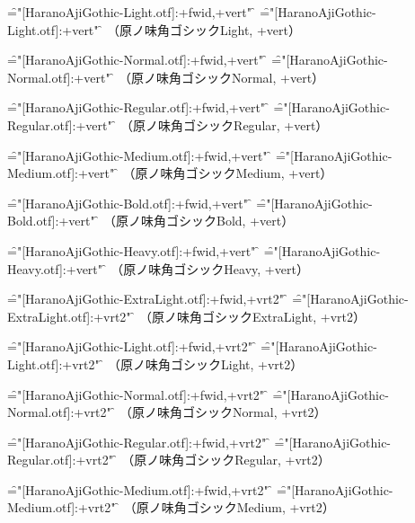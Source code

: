 \font\f="[HaranoAjiGothic-Light.otf]:+fwid,+vert" \f
\testfwid
\font\f="[HaranoAjiGothic-Light.otf]:+vert" \f
\test
（原ノ味角ゴシックLight, +vert）\par

\font\f="[HaranoAjiGothic-Normal.otf]:+fwid,+vert" \f
\testfwid
\font\f="[HaranoAjiGothic-Normal.otf]:+vert" \f
\test
（原ノ味角ゴシックNormal, +vert）\par

\font\f="[HaranoAjiGothic-Regular.otf]:+fwid,+vert" \f
\testfwid
\font\f="[HaranoAjiGothic-Regular.otf]:+vert" \f
\test
（原ノ味角ゴシックRegular, +vert）\par

\font\f="[HaranoAjiGothic-Medium.otf]:+fwid,+vert" \f
\testfwid
\font\f="[HaranoAjiGothic-Medium.otf]:+vert" \f
\test
（原ノ味角ゴシックMedium, +vert）\par

\font\f="[HaranoAjiGothic-Bold.otf]:+fwid,+vert" \f
\testfwid
\font\f="[HaranoAjiGothic-Bold.otf]:+vert" \f
\test
（原ノ味角ゴシックBold, +vert）\par

\font\f="[HaranoAjiGothic-Heavy.otf]:+fwid,+vert" \f
\testfwid
\font\f="[HaranoAjiGothic-Heavy.otf]:+vert" \f
\test
（原ノ味角ゴシックHeavy, +vert）\par


\font\f="[HaranoAjiGothic-ExtraLight.otf]:+fwid,+vrt2" \f
\testfwid
\font\f="[HaranoAjiGothic-ExtraLight.otf]:+vrt2" \f
\test
（原ノ味角ゴシックExtraLight, +vrt2）\par

\font\f="[HaranoAjiGothic-Light.otf]:+fwid,+vrt2" \f
\testfwid
\font\f="[HaranoAjiGothic-Light.otf]:+vrt2" \f
\test
（原ノ味角ゴシックLight, +vrt2）\par

\font\f="[HaranoAjiGothic-Normal.otf]:+fwid,+vrt2" \f
\testfwid
\font\f="[HaranoAjiGothic-Normal.otf]:+vrt2" \f
\test
（原ノ味角ゴシックNormal, +vrt2）\par

\font\f="[HaranoAjiGothic-Regular.otf]:+fwid,+vrt2" \f
\testfwid
\font\f="[HaranoAjiGothic-Regular.otf]:+vrt2" \f
\test
（原ノ味角ゴシックRegular, +vrt2）\par

\font\f="[HaranoAjiGothic-Medium.otf]:+fwid,+vrt2" \f
\testfwid
\font\f="[HaranoAjiGothic-Medium.otf]:+vrt2" \f
\test
（原ノ味角ゴシックMedium, +vrt2）\par

